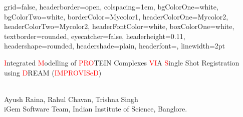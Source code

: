 \documentclass[a0paper,portrait]{baposter}
\begin{document}

\begin{poster}
{
grid=false,
headerborder=open, %
colspacing=1em, %
bgColorOne=white, %
bgColorTwo=white, %
borderColor=Mycolor1, %
headerColorOne=Mycolor2, %
headerColorTwo=Mycolor2, %
headerFontColor=white, %
boxColorOne=white, %
textborder=rounded, %
eyecatcher=false, %
headerheight=0.11\textheight, %
headershape=rounded, %
headershade=plain,
headerfont=\Large\textsf, %
linewidth=2pt %
}
{}
%
%
{

\vspace{1cm}
\textsf %
{
{\fontsize{18}{22}\selectfont \textcolor{red}{I}ntegrated \textcolor{red}{M}odelling of \textcolor{red}{PRO}TEIN Complexes \textcolor{red}{VI}A \textcolor{red}{S}ingle Shot Registration using \textcolor{red}{D}REAM (\textcolor{red}{IMPROVISeD})}
}
} %
{\sf\vspace{0.2em}\\
Ayush Raina, Rahul Chavan, Trishna Singh \\  
iGem Software Team, Indian Institute of Science, Banglore.\\


}
\end{poster}
\end{document}
